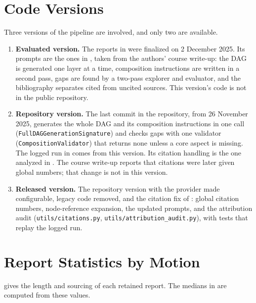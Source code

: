 \section{Code Versions}
\label{app:changes}
Three versions of the pipeline are involved, and only two are available.
\begin{enumerate}
    \item \textbf{Evaluated version.} The reports in  were finalized on 2 December 2025. Its prompts are the ones in , taken from the authors' course write-up: the DAG is generated one layer at a time, composition instructions are written in a second pass, gaps are found by a two-pass explorer and evaluator, and the bibliography separates cited from uncited sources. This version's code is not in the public repository.
    \item \textbf{Repository version.} The last commit in the repository, from 26 November 2025, generates the whole DAG and its composition instructions in one call (\texttt{FullDAGGenerationSignature}) and checks gaps with one validator (\texttt{CompositionValidator}) that returns none unless a core aspect is missing. The logged run in  comes from this version. Its citation handling is the one analyzed in . The course write-up reports that citations were later given global numbers; that change is not in this version.
    \item \textbf{Released version.} The repository version with the provider made configurable, legacy code removed, and the citation fix of : global citation numbers, node-reference expansion, the updated prompts, and the attribution audit (\texttt{utils/citations.py}, \texttt{utils/attribution\_audit.py}), with tests that replay the logged run.
\end{enumerate}

\section{Report Statistics by Motion}
\label{app:reports}
 gives the length and sourcing of each retained report. The medians in  are computed from these values.

\begin{table}[t]
\centering
\small

\caption{Body length in words and number of distinct sources cited in the body of each retained report, and, for \sys{}, the number of sources listed in its bibliography.}
\label{tab:reports}
\end{table}

